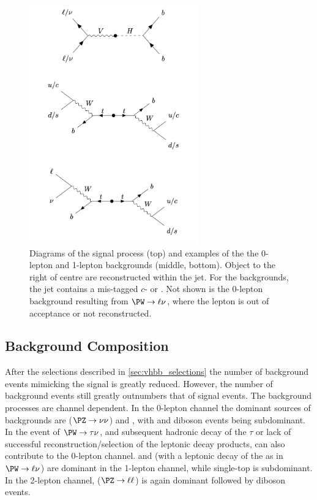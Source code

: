 %
\begin{figure}[!htbp]
  \centering
  \includegraphics[width=0.65\textwidth]{chapters/6.vhbb_boosted/figs/sr_cr_diagrams.pdf}
  \caption{
    Diagrams of the signal process (top) and examples of the the 0-lepton and 1-lepton \ttbar backgrounds (middle, bottom).
    Object to the right of centre are reconstructed within the \largeR jet.
    For the backgrounds, the \largeR jet contains a mis-tagged $c$- or \ljet.
    Not shown is the 0-lepton background resulting from $\Wboson \rightarrow \ell \nu$, where the lepton is out of acceptance or not reconstructed.
  }
  \label{fig:sr_cr_diagrams}
\end{figure}
%

\subsection{Background Composition}\label{sec:vebb_background_composition}

After the selections described in \cref{sec:vhbb_selections} the number of background events mimicking the \VHbb signal is greatly reduced.
However, the number of background events still greatly outnumbers that of signal events.
The background processes are channel dependent.
In the 0-lepton channel the dominant sources of backgrounds are \Zjets ($\Zboson \to \nu\nu$) and \ttbar, with \Wjets and diboson events being subdominant.
In the event of $\Wboson \to \tau\nu$, and subsequent hadronic decay of the $\tau$ or lack of successful reconstruction/selection of the leptonic decay products, \Wjets can also contribute to the 0-lepton channel.
\ttbar and \Wjets (with a leptonic decay of the \Wboson as in $\Wboson \to \ell\nu$) are dominant in the 1-lepton channel, while single-top is subdominant.
In the 2-lepton channel, \Zjets ($\Zboson \to \ell\ell$) is again dominant followed by \Zboson\Zboson diboson events.

